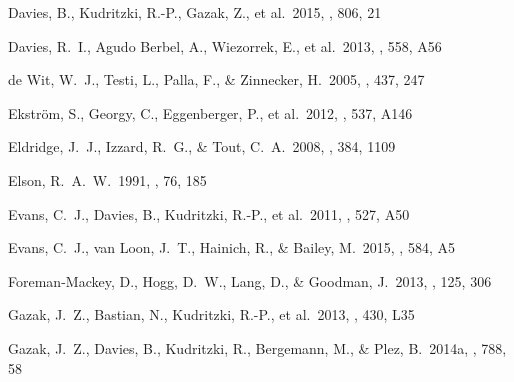 \documentclass[useAMS,usenatbib]{mn2e}
\begin{document}
\begin{thebibliography}{99}
 Davies, B., Kudritzki,
R.-P., Gazak, Z., et al.\ 2015, \apj, 806, 21

 Davies, R.~I., Agudo Berbel, A., Wiezorrek, E., et al.\ 2013, \aap, 558, A56


 de Wit, W.~J., Testi, L., Palla, F., \& Zinnecker, H.\ 2005, \aap, 437, 247

 Ekstr{\"o}m, S., Georgy, C., Eggenberger, P., et al.\ 2012, \aap, 537, A146

 Eldridge, J.~J.,
Izzard, R.~G., \& Tout, C.~A.\ 2008, \mnras, 384, 1109

 Elson, R.~A.~W.\ 1991, \apjs,
76, 185


 Evans, C.~J., Davies, B., Kudritzki, R.-P., et al.\ 2011, \aap, 527, A50


 Evans, C.~J., van Loon, J.~T., Hainich, R., \& Bailey, M.\ 2015, \aap, 584, A5



 Foreman-Mackey,
D., Hogg, D.~W., Lang, D., \& Goodman, J.\ 2013, \pasp, 125, 306

 Gazak, J.~Z., Bastian,
N., Kudritzki, R.-P., et al.\ 2013, \mnras, 430, L35

 Gazak, J.~Z., Davies, B.,
Kudritzki, R., Bergemann, M., \& Plez, B.\ 2014a, \apj, 788, 58


\end{thebibliography}
\end{document}
